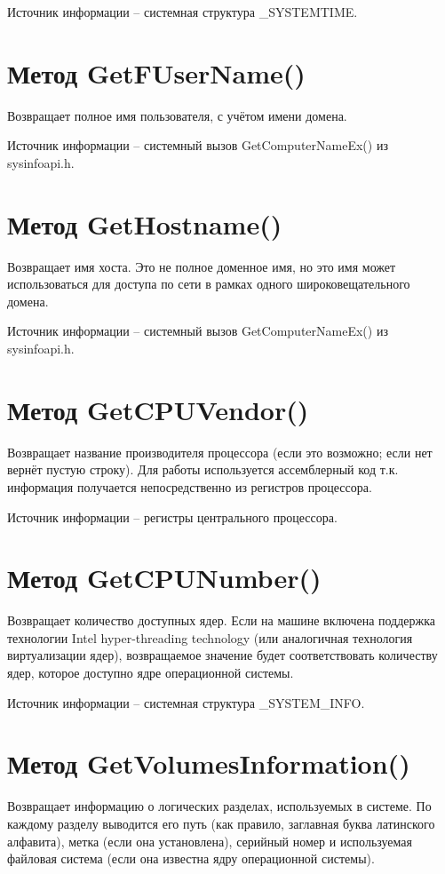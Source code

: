 \documentclass[a4paper, 12pt]{report}		%
\begin{document}
Источник информации -- системная структура \_SYSTEMTIME.

\section*{Метод GetFUserName()}
Возвращает полное имя пользователя, с учётом имени домена.

Источник информации -- системный вызов GetComputerNameEx() из sysinfoapi.h.

\section*{Метод GetHostname()}
Возвращает имя хоста. Это не полное доменное имя, но это имя может использоваться для доступа по сети в рамках одного широковещательного домена.

Источник информации -- системный вызов GetComputerNameEx() из sysinfoapi.h.

\section*{Метод GetCPUVendor()}
Возвращает название производителя процессора (если это возможно; если нет вернёт пустую строку). Для работы используется ассемблерный код т.к. информация получается непосредственно из регистров процессора.

Источник информации -- регистры центрального процессора.

\section*{Метод GetCPUNumber()}
Возвращает количество доступных ядер. Если на машине включена поддержка технологии Intel hyper-threading technology (или аналогичная технология виртуализации ядер), возвращаемое значение будет соответствовать количеству ядер, которое доступно ядре операционной системы.

Источник информации -- системная структура \_SYSTEM\_INFO.

\section*{Метод GetVolumesInformation()}
Возвращает информацию о логических разделах, используемых в системе. По каждому разделу выводится его путь (как правило, заглавная буква латинского алфавита), метка (если она установлена), серийный номер и используемая файловая система (если она известна ядру операционной системы).
\end{document}
